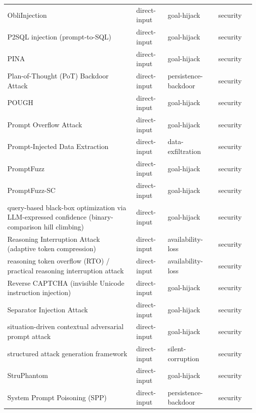\begin{longtable}{@{}>{\raggedright\arraybackslash}p{}llll@{}}
ObliInjection & direct-input & goal-hijack & security & \cite{wang-2025-obliinjection} \\
P2SQL injection (prompt-to-SQL) & direct-input & goal-hijack & security & \cite{pedro-2023-prompt} \\
PINA & direct-input & goal-hijack & security & \cite{liu-2026-pina} \\
Plan-of-Thought (PoT) Backdoor Attack & direct-input & persistence-backdoor & security & \cite{zhang-2024-agent} \\
POUGH & direct-input & goal-hijack & security & \cite{huang-2024-efficient} \\
Prompt Overflow Attack & direct-input & goal-hijack & security & \cite{zhou-2026-prompt} \\
Prompt-Injected Data Extraction & direct-input & data-exfiltration & security & \cite{qi-2024-follow} \\
PromptFuzz & direct-input & goal-hijack & security & \cite{yu-2024-promptfuzz} \\
PromptFuzz-SC & direct-input & goal-hijack & security & \cite{ren-2026-deepseek} \\
query-based black-box optimization via LLM-expressed confidence (binary-comparison hill climbing) & direct-input & goal-hijack & security & \cite{zhang-2025-blackbox} \\
Reasoning Interruption Attack (adaptive token compression) & direct-input & availability-loss & security & \cite{cui-2025-tokenefficient} \\
reasoning token overflow (RTO) / practical reasoning interruption attack & direct-input & availability-loss & security & \cite{cui-2025-practical} \\
Reverse CAPTCHA (invisible Unicode instruction injection) & direct-input & goal-hijack & security & \cite{graves-2026-reverse} \\
Separator Injection Attack & direct-input & goal-hijack & security & \cite{li-2025-separator} \\
situation-driven contextual adversarial prompt attack & direct-input & goal-hijack & security & \cite{das-2024-humaninterpretable} \\
structured attack generation framework & direct-input & silent-corruption & security & \cite{cai-2026-prompt} \\
StruPhantom & direct-input & goal-hijack & security & \cite{feng-2025-struphantom} \\
System Prompt Poisoning (SPP) & direct-input & persistence-backdoor & security & \cite{guo-2025-system} \\

\end{longtable}
